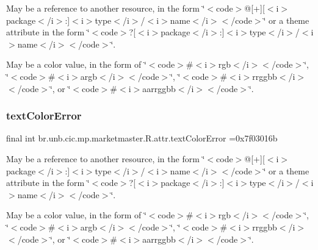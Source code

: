 May be a reference to another resource, in the form \char`\"{}$<$code$>$@\mbox{[}+\mbox{]}\mbox{[}$<$i$>$package$<$/i$>$\+:\mbox{]}$<$i$>$type$<$/i$>$/$<$i$>$name$<$/i$>$$<$/code$>$\char`\"{} or a theme attribute in the form \char`\"{}$<$code$>$?\mbox{[}$<$i$>$package$<$/i$>$\+:\mbox{]}$<$i$>$type$<$/i$>$/$<$i$>$name$<$/i$>$$<$/code$>$\char`\"{}. 

May be a color value, in the form of \char`\"{}$<$code$>$\#$<$i$>$rgb$<$/i$>$$<$/code$>$\char`\"{}, \char`\"{}$<$code$>$\#$<$i$>$argb$<$/i$>$$<$/code$>$\char`\"{}, \char`\"{}$<$code$>$\#$<$i$>$rrggbb$<$/i$>$$<$/code$>$\char`\"{}, or \char`\"{}$<$code$>$\#$<$i$>$aarrggbb$<$/i$>$$<$/code$>$\char`\"{}. \mbox{\label{classbr_1_1unb_1_1cic_1_1mp_1_1marketmaster_1_1R_1_1attr_a8163f1fe1c9219b9c74d2ae5d22d0f5e}} 
\subsubsection{\texorpdfstring{text\+Color\+Error}{textColorError}}
{\footnotesize\ttfamily final int br.\+unb.\+cic.\+mp.\+marketmaster.\+R.\+attr.\+text\+Color\+Error =0x7f03016b\hspace{0.3cm}{\ttfamily [static]}}

May be a reference to another resource, in the form \char`\"{}$<$code$>$@\mbox{[}+\mbox{]}\mbox{[}$<$i$>$package$<$/i$>$\+:\mbox{]}$<$i$>$type$<$/i$>$/$<$i$>$name$<$/i$>$$<$/code$>$\char`\"{} or a theme attribute in the form \char`\"{}$<$code$>$?\mbox{[}$<$i$>$package$<$/i$>$\+:\mbox{]}$<$i$>$type$<$/i$>$/$<$i$>$name$<$/i$>$$<$/code$>$\char`\"{}. 

May be a color value, in the form of \char`\"{}$<$code$>$\#$<$i$>$rgb$<$/i$>$$<$/code$>$\char`\"{}, \char`\"{}$<$code$>$\#$<$i$>$argb$<$/i$>$$<$/code$>$\char`\"{}, \char`\"{}$<$code$>$\#$<$i$>$rrggbb$<$/i$>$$<$/code$>$\char`\"{}, or \char`\"{}$<$code$>$\#$<$i$>$aarrggbb$<$/i$>$$<$/code$>$\char`\"{}. \mbox{\label{classbr_1_1unb_1_1cic_1_1mp_1_1marketmaster_1_1R_1_1attr_a343d2d2ea1b604f6fc9688ec41fa79bc}} 
